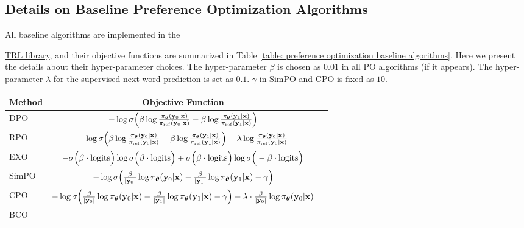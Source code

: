 \subsection{Details on Baseline Preference Optimization Algorithms}
\label{appendix: baseline preference optimization algorithms}
All baseline algorithms are implemented in the {\href{https://huggingface.co/docs/trl/en/index}{TRL library},
and their objective functions are summarized in Table \ref{table: preference optimization baseline algorithms}.
Here we present the details about their hyper-parameter choices.
The hyper-parameter $\beta$ is chosen as $0.01$ in all PO algorithms (if it appears).
The hyper-parameter $\lambda$ for the supervised next-word prediction is set as $0.1$.
$\gamma$ in SimPO and CPO is fixed as $10$.

\begin{table*}[h!]
\centering
\begin{tabular}{l|cc}
\hline
\multicolumn{1}{c|}{Method}  & Objective Function \\ \hline
DPO & 
$
- \log \sigma
\Big(
\beta
\log
\frac{\pi_{\boldsymbol\theta}(\mathbf{y}_0 | \mathbf{x})} 
{\pi_{\rm ref}(\mathbf{y}_0 | \mathbf{x})}
-
\beta
\log
\frac{\pi_{\boldsymbol\theta}(\mathbf{y}_1 | \mathbf{x})} 
{\pi_{\rm ref}(\mathbf{y}_1 | \mathbf{x})}
\Big)
$
\\
RPO & 
$
- \log \sigma
\Big(
\beta
\log
\frac{\pi_{\boldsymbol\theta}(\mathbf{y}_0 | \mathbf{x})} 
{\pi_{\rm ref}(\mathbf{y}_0 | \mathbf{x})}
-
\beta
\log
\frac{\pi_{\boldsymbol\theta}(\mathbf{y}_1 | \mathbf{x})} 
{\pi_{\rm ref}(\mathbf{y}_1 | \mathbf{x})}
\Big)
-
\lambda
\log
\frac{\pi_{\boldsymbol\theta}(\mathbf{y}_0 | \mathbf{x})} 
{\pi_{\rm ref}(\mathbf{y}_0 | \mathbf{x})}
$
\\
EXO &
$
-
\sigma \Big(
\beta 
\cdot
{\rm logits}
\Big)
\log
\sigma \Big(
\beta 
\cdot
{\rm logits}
\Big)
+
\sigma \Big(
\beta 
\cdot
{\rm logits}
\Big)
\log
\sigma \Big(
-
\beta 
\cdot
{\rm logits}
\Big)
$
\\
SimPO &
$
- \log \sigma \Big(\frac{\beta} {|\mathbf{y}_0|} \log \pi_{\boldsymbol\theta} (\mathbf{y}_0 | \mathbf{x}) -  \frac{\beta} {|\mathbf{y}_1|} \log \pi_{\boldsymbol\theta} (\mathbf{y}_1 | \mathbf{x}) - \gamma \Big)
$ 
\\
CPO &
$
- \log \sigma \Big(
\frac{\beta} {|\mathbf{y}_0|} \log \pi_{\boldsymbol\theta} (\mathbf{y}_0 | \mathbf{x}) -  \frac{\beta} {|\mathbf{y}_1|} \log \pi_{\boldsymbol\theta} (\mathbf{y}_1 | \mathbf{x}) - \gamma \Big)
-
\lambda \cdot
\frac{\beta} {|\mathbf{y}_0|} \log \pi_{\boldsymbol\theta} (\mathbf{y}_0 | \mathbf{x})
$
\\
\hline
BCO & 

\end{tabular}
\end{table*}}
